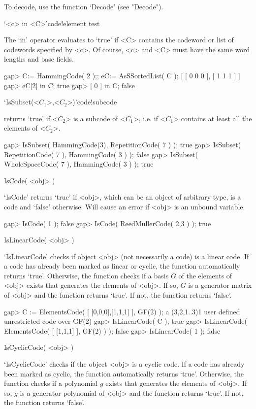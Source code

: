 To decode, use the function `Decode' (see "Decode").

\>`<c> in <C>'{code!element test}

The `in' operator evaluates  to `true'  if  <C> contains the  codeword or
list of codewords specified by <c>. Of course,  <c> and <C> must have the
same word lengths and base fields.

\beginexample
gap> C:= HammingCode( 2 );; eC:= AsSSortedList( C );
[ [ 0 0 0 ], [ 1 1 1 ] ]
gap> eC[2] in C;
true
gap> [ 0 ] in C;
false 
\endexample

\>`IsSubset(<$C_1$>,<$C_2$>)'{code!subcode}

returns `true' if <$C_2$> is a subcode of <$C_1$>,
i.e.  if <$C_1$> contains at least all the elements of <$C_2$>.

\beginexample
gap> IsSubset( HammingCode(3), RepetitionCode( 7 ) );
true
gap> IsSubset( RepetitionCode( 7 ), HammingCode( 3 ) );
false
gap> IsSubset( WholeSpaceCode( 7 ), HammingCode( 3 ) );
true
\endexample


\>IsCode( <obj> )

`IsCode' returns `true'  if <obj>, which  can  be an object  of arbitrary
type, is a code and `false' otherwise. Will cause an error if <obj> is an
unbound variable.

\beginexample
gap> IsCode( 1 );
false
gap> IsCode( ReedMullerCode( 2,3 ) );
true
\endexample

\>IsLinearCode( <obj> )

`IsLinearCode' checks  if object <obj>   (not  necessarily a code) is   a
linear code. If a code  has already been marked  as linear or cyclic, the
function automatically returns `true'.  Otherwise, the function checks if
a basis $G$  of the elements of <obj>  exists that generates the elements
of <obj>. If   so, $G$ is  a generator  matrix of <obj>  and the function
returns `true'. If not, the function returns `false'.

\beginexample
gap> C := ElementsCode( [ [0,0,0],[1,1,1] ], GF(2) );
a (3,2,1..3)1 user defined unrestricted code over GF(2)
gap> IsLinearCode( C );
true
gap> IsLinearCode( ElementsCode( [ [1,1,1] ], GF(2) ) );
false
gap> IsLinearCode( 1 );
false 
\endexample

\>IsCyclicCode( <obj> )

`IsCyclicCode' checks if the object <obj> is a cyclic code. If a code has
already been marked as cyclic, the function automatically returns `true'.
Otherwise, the function checks if  a polynomial $g$ exists that generates
the elements of <obj>. If so, $g$ is a generator  polynomial of <obj> and
the function returns `true'. If not, the function returns `false'.

